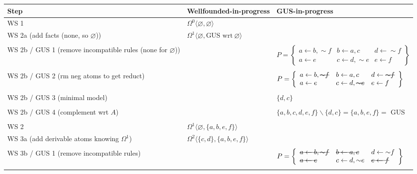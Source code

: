 \documentclass[9pt,a4paper,landscape]{article}
\newcommand{\msout}[1]{\text{\sout{$#1$}}}
\begin{document}
{\begin{center}
	\begin{tabular}{p{5cm}p{5cm}p{7cm}}
		Step & Wellfounded-in-progress & GUS-in-progress\\ \midrule
		WS 1
		& $\Omega^0 \langle \varnothing, \varnothing \rangle$ &\\ \midrule
		WS 2a (add facts (none, so $\varnothing$))
		& $\Omega^1 \langle \varnothing, \text{GUS wrt}\ \varnothing \rangle$ &\\&\\
		WS 2b / GUS 1 (remove incompatible rules (none for $\varnothing$)) 
		&
		& $P = \left\{\begin{array}{lll}
		a \leftarrow b, {\sim} f & b \leftarrow a, c & d \leftarrow {\sim} f\\
		a \leftarrow e & c \leftarrow d, {\sim} e & e \leftarrow f
		\end{array}\right\}$ \\ &\\
		WS 2b / GUS 2 (rm neg atoms to get reduct) 
		& 
		& $P = \left\{\begin{array}{lll}
		a \leftarrow b, \msout{{\sim} f} & b \leftarrow a, c & d \leftarrow \msout{{\sim} f}\\
		a \leftarrow e & c \leftarrow d, \msout{{\sim} e} & e \leftarrow f
		\end{array}\right\}$  \\ &\\
		WS 2b / GUS 3 (minimal model) 
		& 
		& $\{ d, c \}$ \\ &\\
		WS 2b / GUS 4 (complement wrt $A$) 
		&
		&  $\{a, b, c, d, e, f\} \backslash \{d, c\} = \{a, b, e, f\} = $ GUS  \\&\\
		WS 2
		& $\Omega^1 \langle \varnothing, \{a, b, e, f\} \rangle$ &\\ \midrule
		WS 3a (add derivable atoms knowing $\Omega^1$) 
		& $\Omega^2 \langle \{c, d\}, \{a, b, e, f\} \rangle$ &\\&\\
		WS 3b / GUS 1 (remove incompatible rules) 
		&
		& $P = \left\{\begin{array}{lll}
		\msout{a \leftarrow b, {\sim} f} & \msout{b \leftarrow a, c} & d \leftarrow {\sim} f\\
		\msout{a \leftarrow e} & c \leftarrow d, {\sim} e & \msout{e \leftarrow f}
		\end{array}\right\}$ \\ &\\

\end{tabular}
\end{center}}
\end{document}
